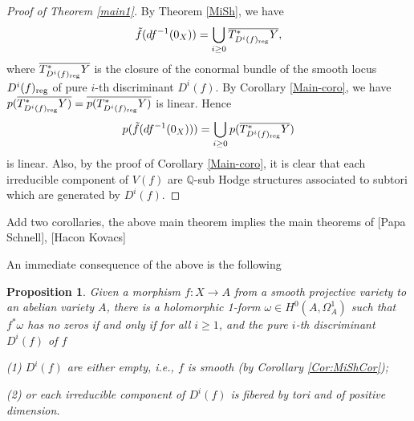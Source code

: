 \documentclass[a4paper,12pt,reqno]{amsart}
\theoremstyle{plain}
\newtheorem{proposition}[theorem]{Proposition}
\theoremstyle{remark}
\newcommand{\Q}{\mathbb Q}
\begin{document}
\begin{proof}[Proof of Theorem \ref{main1}]
By Theorem \ref{MiSh}, we have $$\tilde{f}(df^{-1}(0_X))=\bigcup_{i\geq0}\overline{T^*_{D^i(f)_{\textnormal{reg}}}Y},$$ where $\overline{T^*_{D^i(f)_{\textnormal{reg}}}Y}$ is the closure of the conormal bundle of the smooth locus $D^i(f)_{\textnormal{reg}}$ of pure $i$-th discriminant $D^i(f)$. By Corollary \ref{Main-coro}, we have $p(\overline{T^*_{D^i(f)_{\textnormal{reg}}}Y)}=\overline{p(T^*_{D^i(f)_{\textnormal{reg}}}Y)}$ is linear. Hence $$p(\tilde{f}(df^{-1}(0_X)))=\bigcup_{i\geq0}p(\overline{T^*_{D^i(f)_{\textnormal{reg}}}Y})$$ is linear. Also, by the proof of Corollary \ref{Main-coro}, it is clear that each irreducible component of $V(f)$ are $\Q$-sub Hodge structures associated to subtori which are generated by $D^i(f)$.
\end{proof}




{\color{red} Add two corollaries, the above main theorem implies the main theorems of [Papa Schnell], [Hacon Kovacs]}

An immediate consequence of the above is the
following

\begin{proposition}
Given a morphism $f\colon X\to A$ from a smooth 
projective variety to an abelian variety $A$, there is a holomorphic 1-form $\omega\in H^0(A, \Omega_A^1)$ such that $f^*\omega$ has no zeros if and only
if for all $i\geq1$, and the pure $i$-th discriminant $D^i(f)$ of $f$

(1) $D^i(f)$ are either empty, i.e., $f$ is smooth (by Corollary \ref{Cor:MiShCor});

(2) or each irreducible component of $D^i(f)$ is fibered by tori and of positive dimension. 
\label{thm:nonvanishing}
\end{proposition}
\end{document}
